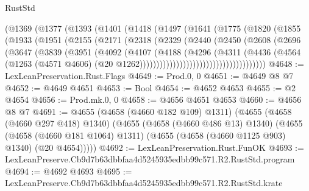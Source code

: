 \begin{lexlean}{RustStd}
\begin{coremodule}
                (@1369
                  (@1377
                    (@1393
                      (@1401
                        (@1418
                          (@1497
                            (@1641
                              (@1775
                                (@1820
                                  (@1855
                                    (@1933
                                      (@1951
                                        (@2155
                                          (@2171
                                            (@2318
                                              (@2329
                                                (@2440
                                                  (@2450
                                                    (@2608
                                                      (@2696
                                                        (@3647
                                                          (@3839
                                                            (@3951
                                                              (@4092
                                                                (@4107
                                                                  (@4188
                                                                    (@4296
                                                                      (@4311
                                                                        (@4436
                                                                          (@4564
                                                                            (@1263
                                                                              (@4571 @4606)
                                                                              (@20
                                                                                @1262))))))))))))))))))))))))))))))))))))))
@4648 := LexLeanPreservation.Rust.Flags
@4649 := Prod.{0, 0}
@4651 := @4649 @8 @7
@4652 := @4649 @4651
@4653 := Bool
@4654 := @4652 @4653
@4655 := @2 @4654
@4656 := Prod.mk.{0, 0}
@4658 := @4656 @4651 @4653
@4660 := @4656 @8 @7
@4691 := @4655
    (@4658 (@4660 @182 @109) @1311)
    (@4655
      (@4658 (@4660 @297 @418) @1340)
      (@4655
        (@4658 (@4660 @486 @13) @1340)
        (@4655
          (@4658 (@4660 @181 @1064) @1311)
          (@4655 (@4658 (@4660 @1125 @903) @1340) (@20 @4654)))))
@4692 := LexLeanPreservation.Rust.FunOK
@4693 := LexLeanPreserve.Cb9d7b63dbbfaa4d5245935edbb99c571.R2.RustStd.program
@4694 := @4692 @4693
@4695 := LexLeanPreserve.Cb9d7b63dbbfaa4d5245935edbb99c571.R2.RustStd.krate

\end{coremodule}
\end{lexlean}

